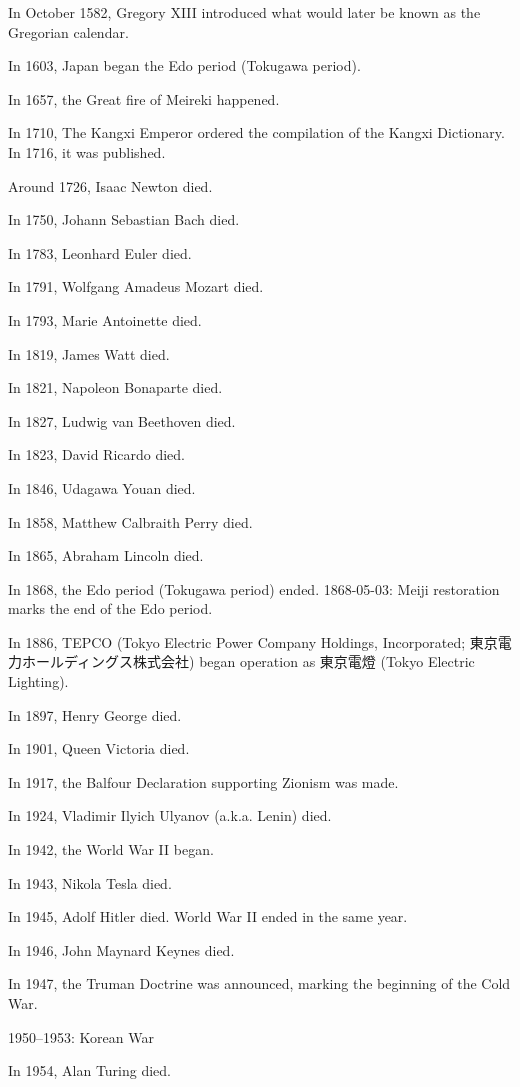 In October 1582, Gregory XIII introduced
what would later be known as the Gregorian calendar.

In 1603, Japan began the Edo period (Tokugawa period).

In 1657, the Great fire of Meireki happened.

In 1710, The Kangxi Emperor ordered the compilation of the Kangxi Dictionary.
In 1716, it was published.

Around 1726, Isaac Newton died.

In 1750, Johann Sebastian Bach died.

In 1783, Leonhard Euler died.

In 1791, Wolfgang Amadeus Mozart died.

In 1793, Marie Antoinette died.

In 1819, James Watt died.

In 1821, Napoleon Bonaparte died.

In 1827, Ludwig van Beethoven died.

In 1823, David Ricardo died.

In 1846, Udagawa Youan died.

In 1858, Matthew Calbraith Perry died.

In 1865, Abraham Lincoln died.

In 1868, the Edo period (Tokugawa period) ended.
1868-05-03: Meiji restoration marks the end of the Edo period.

In 1886, TEPCO
(Tokyo Electric Power Company Holdings, Incorporated; 東京電力ホールディングス株式会社)
began operation as 東京電燈 (Tokyo Electric Lighting).

In 1897, Henry George died.

In 1901, Queen Victoria died.

In 1917, the Balfour Declaration supporting Zionism was made.

In 1924, Vladimir Ilyich Ulyanov (a.k.a. Lenin) died.

In 1942, the World War II began.

In 1943, Nikola Tesla died.

In 1945, Adolf Hitler died.
World War II ended in the same year.

In 1946, John Maynard Keynes died.

In 1947, the Truman Doctrine was announced,
marking the beginning of the Cold War.

1950--1953: Korean War

In 1954, Alan Turing died.

